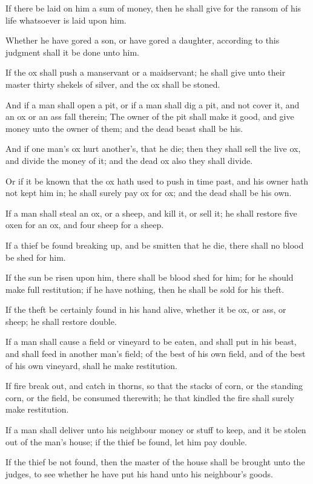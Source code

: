 \Verse If there be laid on him a sum of money, then he shall give for the ransom of his life whatsoever is laid upon him.

\Verse Whether he have gored a son, or have gored a daughter, according to this judgment shall it be done unto him.

\Verse If the ox shall push a manservant or a maidservant; he shall give unto their master thirty shekels of silver, and the ox shall be stoned.

\Verse And if a man shall open a pit, or if a man shall dig a pit, and not cover it, and an ox or an ass fall therein; \Verse The owner of the pit shall make it good, and give money unto the owner of them; and the dead beast shall be his.

\Verse And if one man's ox hurt another's, that he die; then they shall sell the live ox, and divide the money of it; and the dead ox also they shall divide.

\Verse Or if it be known that the ox hath used to push in time past, and his owner hath not kept him in; he shall surely pay ox for ox; and the dead shall be his own.

\Chapter
\Verse If a man shall steal an ox, or a sheep, and kill it, or sell it; he shall restore five oxen for an ox, and four sheep for a sheep.

\Verse If a thief be found breaking up, and be smitten that he die, there shall no blood be shed for him.

\Verse If the sun be risen upon him, there shall be blood shed for him; for he should make full restitution; if he have nothing, then he shall be sold for his theft.

\Verse If the theft be certainly found in his hand alive, whether it be ox, or ass, or sheep; he shall restore double.

\Verse If a man shall cause a field or vineyard to be eaten, and shall put in his beast, and shall feed in another man's field; of the best of his own field, and of the best of his own vineyard, shall he make restitution.

\Verse If fire break out, and catch in thorns, so that the stacks of corn, or the standing corn, or the field, be consumed therewith; he that kindled the fire shall surely make restitution.

\Verse If a man shall deliver unto his neighbour money or stuff to keep, and it be stolen out of the man's house; if the thief be found, let him pay double.

\Verse If the thief be not found, then the master of the house shall be brought unto the judges, to see whether he have put his hand unto his neighbour's goods.

